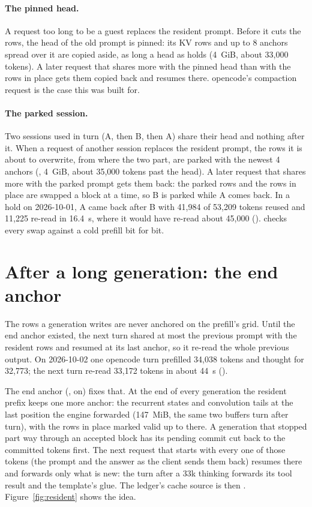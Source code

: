 \paragraph{The pinned head.} A request too long to be a guest replaces the resident prompt. Before it cuts the rows, the head of the old prompt is pinned: its KV rows and up to 8 anchors spread over it are copied aside, as long a head as  holds (4~GiB, about 33,000 tokens). A later request that shares more with the pinned head than with the rows in place gets them copied back and resumes there. opencode's compaction request is the case this was built for.

\paragraph{The parked session.} Two sessions used in turn (A, then B, then A) share their head and nothing after it. When a request of another session replaces the resident prompt, the rows it is about to overwrite, from where the two part, are parked with the newest 4 anchors (, 4~GiB, about 35,000 tokens past the head). A later request that shares more with the parked prompt gets them back: the parked rows and the rows in place are swapped a block at a time, so B is parked while A comes back. In a hold on 2026-10-01, A came back after B with 41,984 of 53,209 tokens reused and 11,225 re-read in 16.4~s, where it would have re-read about 45,000 (\measured).  checks every swap against a cold prefill bit for bit.

\section{After a long generation: the end anchor}\label{sec:end-anchor}

The rows a generation writes are never anchored on the prefill's grid. Until the end anchor existed, the next turn shared at most the previous prompt with the resident rows and resumed at its last anchor, so it re-read the whole previous output. On 2026-10-02 one opencode turn prefilled 34,038 tokens and thought for 32,773; the next turn re-read 33,172 tokens in about 44~s (\measured).

The end anchor (, on) fixes that. At the end of every generation the resident prefix keeps one more anchor: the recurrent states and convolution tails at the last position the engine forwarded (147~MiB, the same two buffers turn after turn), with the rows in place marked valid up to there. A generation that stopped part way through an accepted block has its pending commit cut back to the committed tokens first. The next request that starts with every one of those tokens (the prompt and the answer as the client sends them back) resumes there and forwards only what is new: the turn after a 33k thinking forwards its tool result and the template's glue. The ledger's cache source is then . Figure~\ref{fig:resident} shows the idea.

